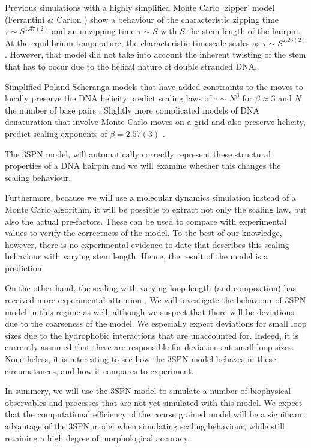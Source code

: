 Previous simulations with a highly simplified Monte Carlo `zipper' model (Ferrantini \& Carlon \cite{carlon2011anomalous}) show a behaviour of the characteristic zipping time $\tau \sim S^{1.37(2)}$ and an unzipping time $\tau \sim S$ with $S$ the stem length of the hairpin. At the equilibrium temperature, the characteristic timescale scales as $\tau \sim S^{2.26(2)}$ \cite{walter2011fractional}. However, that model did not take into account the inherent twisting of the stem that has to occur due to the helical nature of double stranded DNA.

Simplified Poland Scheranga models that have added constraints to the moves to locally preserve the DNA helicity predict scaling laws of $\tau \sim N^{\beta}$ for $\beta \approx 3$ and $N$ the number of base pairs \cite{baiesi2009multiple}.
Slightly more complicated models of DNA denaturation that involve Monte Carlo moves on a grid and also preserve helicity, predict scaling exponents of $\beta = 2.57(3)$  \cite{carlon2010unwinding}.

The 3SPN model, will automatically correctly represent these structural properties of a DNA hairpin and we will examine whether this changes the scaling behaviour. 

Furthermore, because we will use a molecular dynamics simulation instead of a Monte Carlo algorithm, it will be possible to extract not only the scaling law, but also the actual pre-factors. These can be used to compare with experimental values to verify the correctness of the model. To the best of our knowledge, however, there is no experimental evidence to date that describes this scaling behaviour with varying stem length. Hence, the result of the model is a prediction.

On the other hand, the scaling with varying loop length (and composition) has received more experimental attention \cite{bonnet1998kinetics}. We will investigate the behaviour of 3SPN model in this regime as well, although we suspect that there will be deviations due to the coarseness of the model. We especially expect deviations for small loop sizes due to the hydrophobic interactions that are unaccounted for. Indeed, it is currently assumed \cite{vallone1999melting, shen2001loop} that these are responsible for deviations at small loop sizes. Nonetheless, it is interesting to see how the 3SPN model behaves in these circumstances, and how it compares to experiment.

In summery, we will use the 3SPN model to simulate a number of biophysical observables and processes that are not yet simulated with this model. We expect that the computational efficiency of the coarse grained model will be a significant advantage of the 3SPN model when simulating scaling behaviour, while still retaining a high degree of morphological accuracy.
